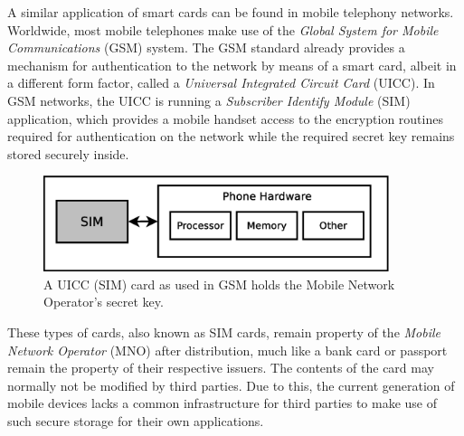 A similar application of smart cards can be found in mobile telephony networks.
Worldwide, most mobile telephones make use of the \textit{Global System for Mobile Communications} (GSM) system.
The GSM standard already provides a mechanism for authentication to the network by means of a smart card, albeit in a different form factor, called a \textit{Universal Integrated Circuit Card} (UICC).
In GSM networks, the UICC is running a \textit{Subscriber Identify Module} (SIM) application, which provides a mobile handset access to the encryption routines required for authentication on the network while the required secret key remains stored securely inside.

\begin{figure}
\includegraphics[width=0.9\textwidth]{images/SIM_in_GSM}
\caption[UICC running SIM application in GSM]
{
A UICC (SIM) card as used in GSM holds the Mobile Network Operator's secret key.
}
\label{fig:gsm_sim}
\end{figure}

These types of cards, also known as SIM cards, remain property of the \textit{Mobile Network Operator} (MNO) after distribution, much like a bank card or passport remain the property of their respective issuers. %
The contents of the card may normally not be modified by third parties.
Due to this, the current generation of mobile devices lacks a common infrastructure for third parties to make use of such secure storage for their own applications.





